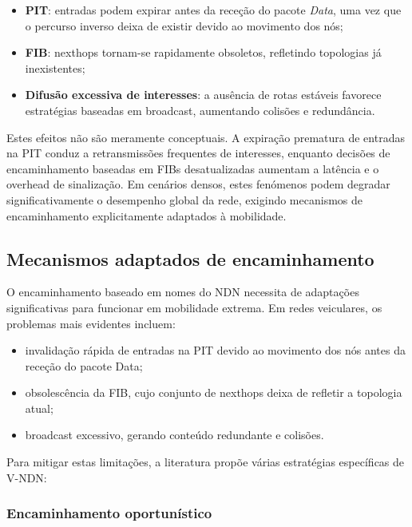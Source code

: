 \begin{itemize}
    \item \textbf{\gls{PIT}}: entradas podem expirar antes da receção do pacote \textit{Data}, uma vez que o percurso inverso deixa de existir devido ao movimento dos nós;
    \item \textbf{\gls{FIB}}: nexthops tornam-se rapidamente obsoletos, refletindo topologias já inexistentes;
    \item \textbf{Difusão excessiva de interesses}: a ausência de rotas estáveis favorece estratégias baseadas em broadcast, aumentando colisões e redundância.
\end{itemize}

Estes efeitos não são meramente conceptuais. A expiração prematura de entradas na PIT conduz a retransmissões frequentes de interesses, enquanto decisões de encaminhamento baseadas em FIBs desatualizadas aumentam a latência e o overhead de sinalização. Em cenários densos, estes fenómenos podem degradar significativamente o desempenho global da rede, exigindo mecanismos de encaminhamento explicitamente adaptados à mobilidade.

\subsection{Mecanismos adaptados de encaminhamento}

O encaminhamento baseado em nomes do NDN necessita de adaptações significativas para funcionar
em mobilidade extrema. Em redes veiculares, os problemas mais evidentes incluem:
\begin{itemize}
    \item  invalidação rápida de entradas na PIT devido ao movimento dos nós antes da receção do
pacote Data;
\item obsolescência da FIB, cujo conjunto de nexthops deixa de refletir a topologia atual;
\item  broadcast excessivo, gerando conteúdo redundante e colisões.
\end{itemize}

Para mitigar estas limitações, a literatura propõe várias estratégias específicas de V-NDN:

\subsubsection*{Encaminhamento oportunístico}

